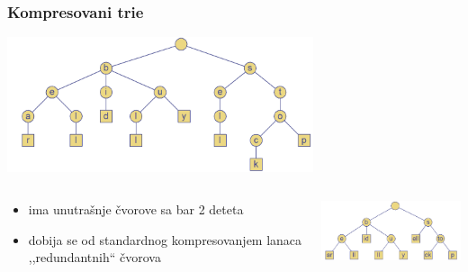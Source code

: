 \documentclass[compress]{beamer}
\begin{document}
\begin{frame}[fragile]
  \frametitle{Kompresovani trie}
  \begin{center}
    \includegraphics[width=9cm]{asp-13-pic21.png}
  \end{center}
  \begin{columns}
    \begin{column}[t]{5cm}
      {\footnotesize
      \begin{itemize}
        \item {} ima unutrašnje čvorove sa bar 2 deteta
        \item dobija se od standardnog kompresovanjem lanaca ,,redundantnih`` čvorova
      \end{itemize}}
    \end{column}
    \begin{column}[t]{7cm}
      \begin{center}
        \includegraphics[width=6cm]{asp-13-pic22.png}
      \end{center}
    \end{column}
  \end{columns}
\end{frame}
\end{document}
